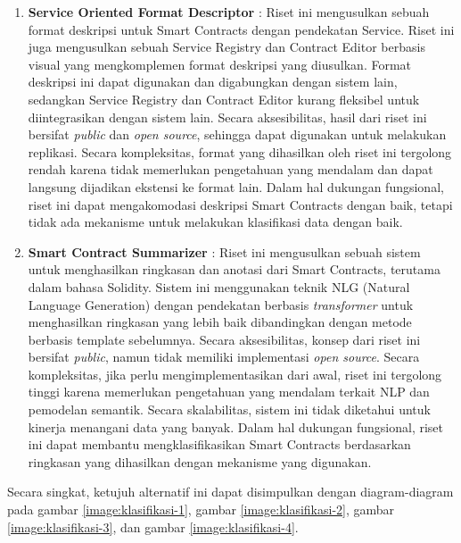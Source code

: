 \begin{enumerate}
    \item \textbf{Service Oriented Format Descriptor} \parencite{guida2019supporting}: Riset ini mengusulkan sebuah format deskripsi untuk Smart Contracts dengan pendekatan Service. Riset ini juga mengusulkan sebuah Service Registry dan Contract Editor berbasis visual yang mengkomplemen format deskripsi yang diusulkan. Format deskripsi ini dapat digunakan dan digabungkan dengan sistem lain, sedangkan Service Registry dan Contract Editor kurang fleksibel untuk diintegrasikan dengan sistem lain. Secara aksesibilitas, hasil dari riset ini bersifat \textit{public} dan \textit{open source}, sehingga dapat digunakan untuk melakukan replikasi. Secara kompleksitas, format yang dihasilkan oleh riset ini tergolong rendah karena tidak memerlukan pengetahuan yang mendalam dan dapat langsung dijadikan ekstensi ke format lain. Dalam hal dukungan fungsional, riset ini dapat mengakomodasi deskripsi Smart Contracts dengan baik, tetapi tidak ada mekanisme untuk melakukan klasifikasi data dengan baik.
    
    \item \textbf{Smart Contract Summarizer} \parencite{zhang2021smart}: Riset ini mengusulkan sebuah sistem untuk menghasilkan ringkasan dan anotasi dari Smart Contracts, terutama dalam bahasa Solidity. Sistem ini menggunakan teknik NLG (Natural Language Generation) dengan pendekatan berbasis \textit{transformer} untuk menghasilkan ringkasan yang lebih baik dibandingkan dengan metode berbasis template sebelumnya. Secara aksesibilitas, konsep dari riset ini bersifat \textit{public}, namun tidak memiliki implementasi \textit{open source}. Secara kompleksitas, jika perlu mengimplementasikan dari awal, riset ini tergolong tinggi karena memerlukan pengetahuan yang mendalam terkait NLP dan pemodelan semantik. Secara skalabilitas, sistem ini tidak diketahui untuk kinerja menangani data yang banyak. Dalam hal dukungan fungsional, riset ini dapat membantu mengklasifikasikan Smart Contracts berdasarkan ringkasan yang dihasilkan dengan mekanisme yang digunakan.

\end{enumerate}

Secara singkat, ketujuh alternatif ini dapat disimpulkan dengan diagram-diagram pada gambar \ref{image:klasifikasi-1}, gambar \ref{image:klasifikasi-2}, gambar \ref{image:klasifikasi-3}, dan gambar \ref{image:klasifikasi-4}.

